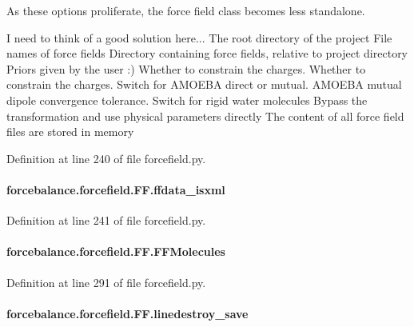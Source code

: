 As these options proliferate, the force field class becomes less standalone. 

I need to think of a good solution here... The root directory of the project File names of force fields Directory containing force fields, relative to project directory Priors given by the user \-:) Whether to constrain the charges. Whether to constrain the charges. Switch for A\-M\-O\-E\-B\-A direct or mutual. A\-M\-O\-E\-B\-A mutual dipole convergence tolerance. Switch for rigid water molecules Bypass the transformation and use physical parameters directly The content of all force field files are stored in memory 

Definition at line 240 of file forcefield.\-py.

\hypertarget{classforcebalance_1_1forcefield_1_1FF_af942210095e12b4995a64ca461cd5d76}{
\paragraph[{ffdata\-\_\-isxml}]{\setlength{\rightskip}{0pt plus 5cm}forcebalance.\-forcefield.\-F\-F.\-ffdata\-\_\-isxml}}\label{classforcebalance_1_1forcefield_1_1FF_af942210095e12b4995a64ca461cd5d76}


Definition at line 241 of file forcefield.\-py.

\hypertarget{classforcebalance_1_1forcefield_1_1FF_aa5ba15f51599b631b9be90cda847f1d9}{
\paragraph[{F\-F\-Molecules}]{\setlength{\rightskip}{0pt plus 5cm}forcebalance.\-forcefield.\-F\-F.\-F\-F\-Molecules}}\label{classforcebalance_1_1forcefield_1_1FF_aa5ba15f51599b631b9be90cda847f1d9}


Definition at line 291 of file forcefield.\-py.

\hypertarget{classforcebalance_1_1forcefield_1_1FF_aa4f1adc1fc16e922c98145553ac5b67f}{
\paragraph[{linedestroy\-\_\-save}]{\setlength{\rightskip}{0pt plus 5cm}forcebalance.\-forcefield.\-F\-F.\-linedestroy\-\_\-save}}\label{classforcebalance_1_1forcefield_1_1FF_aa4f1adc1fc16e922c98145553ac5b67f}


